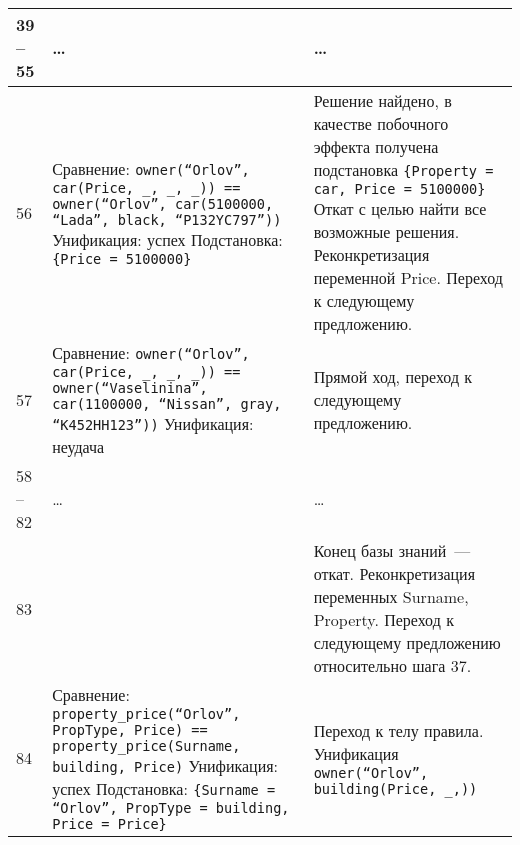 \begin{xltabular}{\textwidth}{|l|X|Y|}
		39 -- 55 & \centering \dots & \dots \\ \hline
		
		56 &
		Сравнение:\newline
		\texttt{owner(``Orlov'', car(Price, \_, \_, \_)) == owner(``Orlov'', car(5100000, ``Lada'', black, ``P132YC797''))} \newline\newline
		Унификация: успех \newline\newline
		Подстановка: \texttt{\{Price = 5100000\}} & 
		Решение найдено, в качестве побочного эффекта получена подстановка \texttt{\{Property = car, Price = 5100000\}} \newline\newline 
		Откат с целью найти все возможные решения.
		Реконкретизация переменной Price.
		Переход к следующему предложению.\\ \hline
		
		57 &
		Сравнение:\newline
		\texttt{owner(``Orlov'', car(Price, \_, \_, \_)) == owner(``Vaselinina'', car(1100000, ``Nissan'', gray, ``K452HH123''))} \newline\newline
		Унификация: неудача &
		Прямой ход, переход к следующему предложению. \\ \hline
		
		58 -- 82 & \centering \dots & \dots \\ \hline
		 
		83 &
		 &
		Конец базы знаний~--- откат.
		Реконкретизация переменных Surname, Property.
		Переход к следующему предложению относительно шага 37.\\ \hline
		
		84 &
		Сравнение:\newline
		\texttt{property\_price(``Orlov'', PropType, Price) == property\_price(Surname, building, Price)} \newline\newline
		Унификация: успех \newline\newline
		Подстановка:\newline
		\texttt{\{Surname = ``Orlov'', PropType = building, Price = Price\}} & 
		Переход к телу правила. \newline\newline
		Унификация\newline
		\texttt{owner(``Orlov'', building(Price, \_,))} \\ \hline
		

\end{xltabular}
